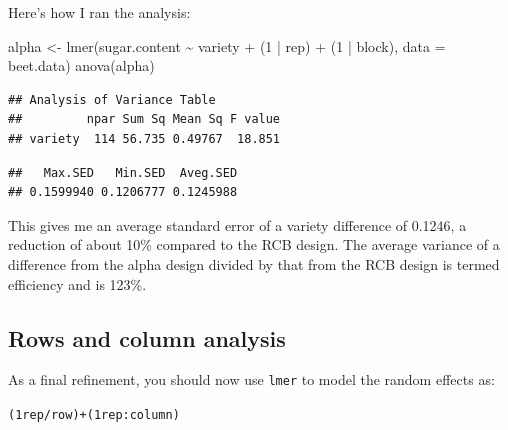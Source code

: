 \documentclass[
]{book}
\newenvironment{Shaded}{\begin{snugshade}}{\end{snugshade}}
\newcommand{\AttributeTok}[1]{\textcolor[rgb]{0.77,0.63,0.00}{#1}}
\newcommand{\DecValTok}[1]{\textcolor[rgb]{0.00,0.00,0.81}{#1}}
\newcommand{\FunctionTok}[1]{\textcolor[rgb]{0.00,0.00,0.00}{#1}}
\newcommand{\NormalTok}[1]{#1}
\newcommand{\OtherTok}[1]{\textcolor[rgb]{0.56,0.35,0.01}{#1}}
\newcommand{\SpecialCharTok}[1]{\textcolor[rgb]{0.00,0.00,0.00}{#1}}
\newcommand{\StringTok}[1]{\textcolor[rgb]{0.31,0.60,0.02}{#1}}
\begin{document}
Here's how I ran the analysis:

\begin{Shaded}
\begin{Highlighting}[]
\NormalTok{alpha }\OtherTok{\textless{}{-}} \FunctionTok{lmer}\NormalTok{(sugar.content }\SpecialCharTok{\textasciitilde{}}\NormalTok{ variety }\SpecialCharTok{+}\NormalTok{ (}\DecValTok{1} \SpecialCharTok{|}\NormalTok{ rep) }\SpecialCharTok{+}\NormalTok{ (}\DecValTok{1} \SpecialCharTok{|}\NormalTok{ block), }
    \AttributeTok{data =}\NormalTok{ beet.data)}
\FunctionTok{anova}\NormalTok{(alpha)}
\end{Highlighting}
\end{Shaded}

\begin{verbatim}
## Analysis of Variance Table
##         npar Sum Sq Mean Sq F value
## variety  114 56.735 0.49767  18.851
\end{verbatim}

\begin{Shaded}
\end{Shaded}

\begin{verbatim}
##   Max.SED   Min.SED  Aveg.SED 
## 0.1599940 0.1206777 0.1245988
\end{verbatim}

This gives me an average standard error of a variety difference of 0.1246, a reduction of about 10\% compared to the RCB design. The average variance of a difference from the alpha design divided by that from the RCB design is termed efficiency and is 123\%.

\hypertarget{rows-and-column-analysis}{%
\subsection{Rows and column analysis}\label{rows-and-column-analysis}}

As a final refinement, you should now use \texttt{lmer} to model the random effects as:

\texttt{(1\textbar{}rep/row)+(1\textbar{}rep:column)}
\end{document}

